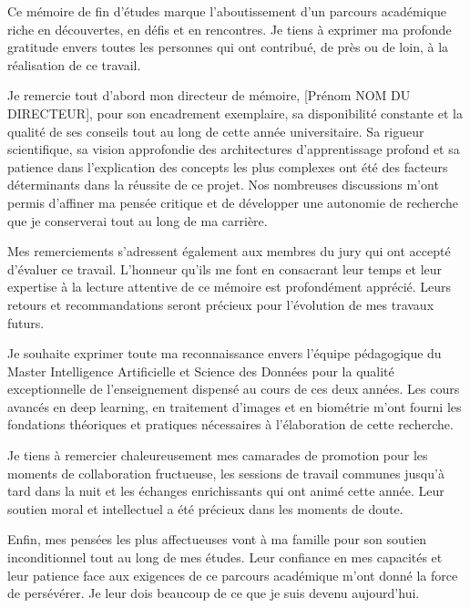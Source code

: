 \documentclass[12pt,a4paper]{report}
\begin{document}
Ce m\'{e}moire de fin d'\'{e}tudes marque l'aboutissement d'un parcours acad\'{e}mique riche en d\'{e}couvertes, en d\'{e}fis et en rencontres. Je tiens \`{a} exprimer ma profonde gratitude envers toutes les personnes qui ont contribu\'{e}, de pr\`{e}s ou de loin, \`{a} la r\'{e}alisation de ce travail.

Je remercie tout d'abord mon directeur de m\'{e}moire, [Pr\'{e}nom NOM DU DIRECTEUR], pour son encadrement exemplaire, sa disponibilit\'{e} constante et la qualit\'{e} de ses conseils tout au long de cette ann\'{e}e universitaire. Sa rigueur scientifique, sa vision approfondie des architectures d'apprentissage profond et sa patience dans l'explication des concepts les plus complexes ont \'{e}t\'{e} des facteurs d\'{e}terminants dans la r\'{e}ussite de ce projet. Nos nombreuses discussions m'ont permis d'affiner ma pens\'{e}e critique et de d\'{e}velopper une autonomie de recherche que je conserverai tout au long de ma carri\`{e}re.

Mes remerciements s'adressent \'{e}galement aux membres du jury qui ont accept\'{e} d'\'{e}valuer ce travail. L'honneur qu'ils me font en consacrant leur temps et leur expertise \`{a} la lecture attentive de ce m\'{e}moire est profond\'{e}ment appr\'{e}ci\'{e}. Leurs retours et recommandations seront pr\'{e}cieux pour l'\'{e}volution de mes travaux futurs.

Je souhaite exprimer toute ma reconnaissance envers l'\'{e}quipe p\'{e}dagogique du Master Intelligence Artificielle et Science des Donn\'{e}es pour la qualit\'{e} exceptionnelle de l'enseignement dispens\'{e} au cours de ces deux ann\'{e}es. Les cours avanc\'{e}s en deep learning, en traitement d'images et en biom\'{e}trie m'ont fourni les fondations th\'{e}oriques et pratiques n\'{e}cessaires \`{a} l'\'{e}laboration de cette recherche.

Je tiens \`{a} remercier chaleureusement mes camarades de promotion pour les moments de collaboration fructueuse, les sessions de travail communes jusqu'\`{a} tard dans la nuit et les \'{e}changes enrichissants qui ont anim\'{e} cette ann\'{e}e. Leur soutien moral et intellectuel a \'{e}t\'{e} pr\'{e}cieux dans les moments de doute.

Enfin, mes pens\'{e}es les plus affectueuses vont \`{a} ma famille pour son soutien inconditionnel tout au long de mes \'{e}tudes. Leur confiance en mes capacit\'{e}s et leur patience face aux exigences de ce parcours acad\'{e}mique m'ont donn\'{e} la force de pers\'{e}v\'{e}rer. Je leur dois beaucoup de ce que je suis devenu aujourd'hui.
\end{document}
